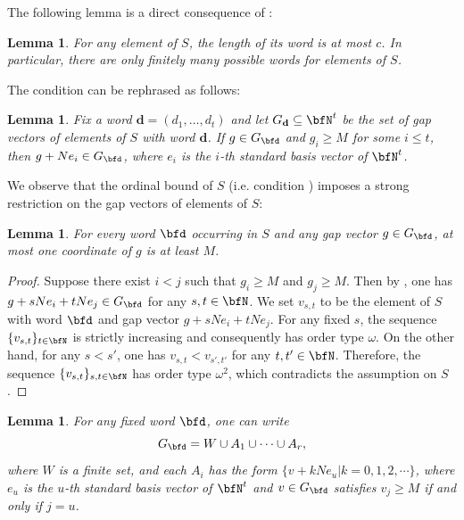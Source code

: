 \documentclass[english,oneside]{smfart}
\newtheorem{lemma}[theorem]{Lemma}
\begin{document}
The following lemma is a direct consequence of :
\begin{lemma}\label{lem:5966}
    For any element of $S$, the length of its word is at most $c$. In particular, there are only finitely many possible words for elements of $S$.
\end{lemma}
The condition  can be rephrased as follows:
\begin{lemma}\label{lem:30089}
    Fix a word $\mathbf{d}=(d_1,\ldots,d_t)$ and let $G_{\mathbf{d}}\subseteq \bfN^t$ be the set of gap vectors of elements of $S$ with word $\mathbf{d}$. If $g\in G_{\bfd}$ and $g_i\geq M$ for some $i\leq t$, then $g+N e_i\in G_{\bfd}$, where $e_i$ is the $i$-th standard basis vector of $\bfN^t$.
\end{lemma}
We observe that the ordinal bound of $S$ (i.e. condition ) imposes a strong restriction on the gap vectors of elements of $S$:
\begin{lemma}\label{lem:27279}
    For every word $\bfd$ occurring in $S$ and any gap vector $g\in G_{\bfd}$, at most one coordinate of $g$ is at least $M$.
\end{lemma}
\begin{proof}
    Suppose there exist $i<j$ such that $g_i\geq M$ and $g_j\geq M$. Then by , one has $g+sNe_i+tNe_j\in G_{\bfd}$ for any $s,t\in\bfN$. We set $v_{s,t}$ to be the element of $S$ with word $\bfd$ and gap vector $g+sNe_i+tNe_j$. For any fixed $s$, the sequence $\{v_{s,t}\}_{t\in\bfN}$ is strictly increasing and consequently has order type $\omega$. On the other hand, for any $s<s'$, one has $v_{s,t}<v_{s',t'}$ for any $t,t'\in\bfN$. Therefore, the sequence $\{v_{s,t}\}_{s,t\in\bfN}$ has order type $\omega^2$, which contradicts the assumption on $S$.
\end{proof}
\begin{lemma}\label{lem:19048}
    For any fixed word $\bfd$, one can write
    $$G_{\bfd}=W\cup A_1\cup\cdots \cup A_r,$$
    where $W$ is a finite set, and each $A_i$ has the form $\{v+kN e_u|k=0,1,2,\cdots\}$, where $e_u$ is the $u$-th standard basis vector of $\bfN^t$ and $v\in G_{\bfd}$ satisfies $v_j\geq M$ if and only if $j=u$.
\end{lemma}
\end{document}
